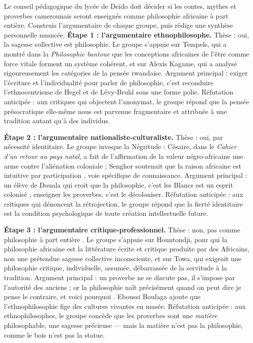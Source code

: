 \documentclass[11pt]{article}
\begin{document}
\begin{exoresolu}
Le conseil pédagogique du lycée de Deïdo doit décider si les contes, mythes et proverbes camerounais seront enseignés comme \guillemotleft philosophie africaine \guillemotright à part entière. Construis l'argumentaire de chaque groupe, puis rédige une synthèse personnelle nuancée.
\tcblower
\textbf{Étape 1 : l'argumentaire ethnophilosophe.} Thèse : oui, la sagesse collective est philosophie. Le groupe s'appuie sur Tempels, qui a montré dans la \emph{Philosophie bantoue} que les conceptions africaines de l'être comme force vitale forment un système cohérent, et sur Alexis Kagame, qui a analysé rigoureusement les catégories de la pensée rwandaise. Argument principal : exiger l'écriture et l'individualité pour parler de philosophie, c'est reconduire l'ethnocentrisme de Hegel et de Lévy-Bruhl sous une forme polie. Réfutation anticipée : aux critiques qui objectent l'anonymat, le groupe répond que la pensée présocratique elle-même nous est parvenue fragmentaire et attribuée à une tradition autant qu'à des individus.

\textbf{Étape 2 : l'argumentaire nationaliste-culturaliste.} Thèse : oui, par nécessité identitaire. Le groupe invoque la Négritude : Césaire, dans le \emph{Cahier d'un retour au pays natal}, a fait de l'affirmation de la valeur négro-africaine une arme contre l'aliénation coloniale ; Senghor soutenait que la raison africaine est \guillemotleft intuitive par participation \guillemotright, voie spécifique de connaissance. Argument principal : un élève de Douala qui croit que \guillemotleft la philosophie, c'est les Blancs \guillemotright est un esprit colonisé ; enseigner les proverbes, c'est le décoloniser. Réfutation anticipée : aux critiques qui dénoncent la rétrojection, le groupe répond que la fierté identitaire est la condition psychologique de toute création intellectuelle future.

\textbf{Étape 3 : l'argumentaire critique-professionnel.} Thèse : non, pas \guillemotleft comme philosophie à part entière \guillemotright. Le groupe s'appuie sur Hountondji, pour qui la philosophie africaine est la littérature écrite et critique produite par des Africains, non une prétendue sagesse collective inconsciente, et sur Towa, qui exigeait une philosophie critique, individuelle, assumée, débarrassée de la \guillemotleft servitude \guillemotright à la tradition. Argument principal : un proverbe ne se discute pas, il s'impose par l'autorité des anciens ; or la philosophie naît précisément quand on peut dire \guillemotleft je pense le contraire, et voici pourquoi \guillemotright. Eboussi Boulaga ajoute que l'ethnophilosophie fige des cultures vivantes en musée. Réfutation anticipée : aux ethnophilosophes, le groupe concède que les proverbes sont une \emph{matière} philosophable, une sagesse précieuse — mais la matière n'est pas la philosophie, comme le bois n'est pas la statue.


\end{exoresolu}
\end{document}
